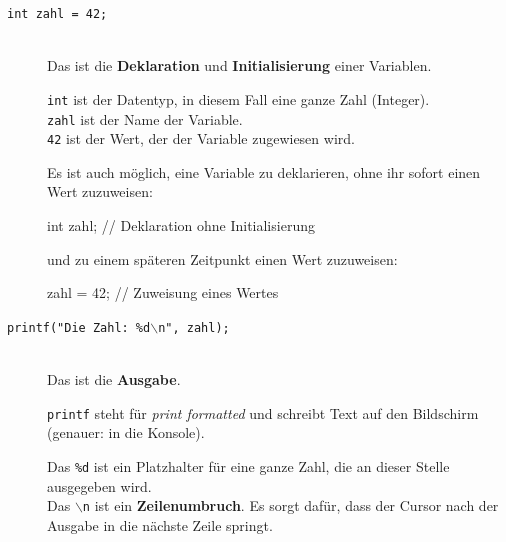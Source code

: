 \begin{description}
    \item[\texttt{int zahl = 42;}]\hfill\\
        Das ist die \textbf{Deklaration} und \textbf{Initialisierung} einer Variablen.

        \texttt{int} ist der Datentyp, in diesem Fall eine ganze Zahl (Integer).\\
        \texttt{zahl} ist der Name der Variable.\\
        \texttt{42} ist der Wert, der der Variable zugewiesen wird.

        Es ist auch möglich, eine Variable zu deklarieren, ohne ihr sofort einen Wert zuzuweisen:\\
        \begin{code}
  int zahl; // Deklaration ohne Initialisierung
        \end{code}
        und zu einem späteren Zeitpunkt einen Wert zuzuweisen:\\
        \begin{code}
  zahl = 42; // Zuweisung eines Wertes
        \end{code}
    \item[\texttt{printf("Die Zahl: \%d$\backslash$n", zahl);}]\hfill\\
        Das ist die \textbf{Ausgabe}.

        \texttt{printf} steht für \textit{print formatted} und schreibt Text
        auf den Bildschirm (genauer: in die Konsole).

        Das \texttt{\%d} ist ein Platzhalter für eine ganze Zahl, die an dieser Stelle ausgegeben wird.\\
        Das \texttt{$\backslash$n} ist ein \textbf{Zeilenumbruch}.
        Es sorgt dafür, dass der Cursor nach der Ausgabe in die nächste Zeile springt.
\end{description}